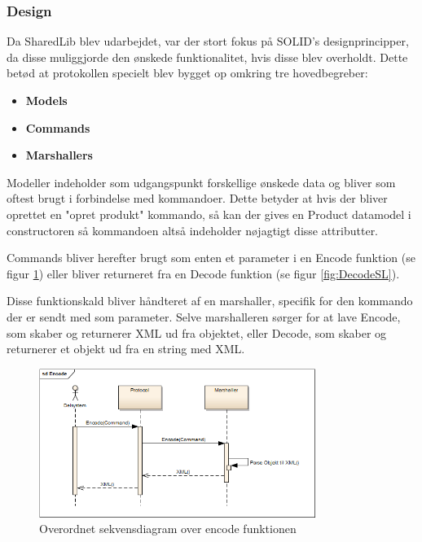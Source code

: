 \subsubsection{Design}
Da SharedLib blev udarbejdet, var der stort fokus på SOLID's designprincipper, da disse muliggjorde den ønskede funktionalitet, hvis disse blev overholdt. Dette betød at protokollen specielt blev bygget op omkring tre hovedbegreber:

\begin{itemize}
	\item \textbf{Models}
	\item \textbf{Commands} 
	\item \textbf{Marshallers}
\end{itemize}





Modeller indeholder som udgangspunkt forskellige ønskede data og bliver som oftest brugt i forbindelse med kommandoer. Dette betyder at hvis der bliver oprettet en "opret produkt" kommando, så kan der gives en Product datamodel i constructoren så kommandoen altså indeholder nøjagtigt disse attributter. 

Commands bliver herefter brugt som enten et parameter i en Encode funktion (se figur \ref{fig:EncodeSL}) eller bliver returneret fra en Decode funktion (se figur \ref{fig:DecodeSL}). 

Disse funktionskald bliver håndteret af en marshaller, specifik for den kommando der er sendt med som parameter. Selve marshalleren sørger for at lave Encode, som skaber og returnerer XML ud fra objektet, eller Decode, som skaber og returnerer et objekt ud fra en string med XML.

\begin{figure}[H]
	\centering
	\includegraphics[width=0.8\textwidth]{Projektbeskrivelse/DesignOgImplementering/SharedLib/Images/Rapport/Encode.png}
	\caption{Overordnet sekvensdiagram over encode funktionen}
	\label{fig:EncodeSL}
\end{figure}

